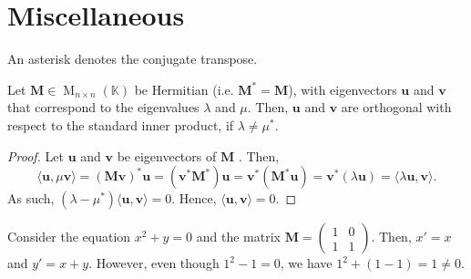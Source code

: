 \documentclass[../Notes.tex]{subfiles}
\begin{document}
\section{Miscellaneous}
An asterisk denotes the conjugate transpose.
\begin{theorem}{}{}
    Let \(\mathbf{M}\in \operatorname{M}_{n \times n}(\mathbb{K})\) be Hermitian (i.e. \(\mathbf{M}^{*}=\mathbf{M}\)), with eigenvectors \(\mathbf{u}\) and \(\mathbf{v}\) that correspond to the eigenvalues \(\lambda\) and \(\mu\). Then, \(\mathbf{u}\) and \(\mathbf{v}\) are orthogonal with respect to the standard inner product, if \(\lambda\neq\mu^{*}\). 
\end{theorem}
\begin{proof}
    Let \(\mathbf{u}\) and \(\mathbf{v}\) be eigenvectors of \(\mathbf{M}\) . Then, 
    \[\langle \mathbf{u},\mu\mathbf{v} \rangle=(\mathbf{M} \mathbf{v})^{*}\mathbf{u}=(\mathbf{v}^{*}\mathbf{M}^{*})\mathbf{u}=\mathbf{v}^{*}(\mathbf{M}^{*}\mathbf{u})=\mathbf{v}^{*}(\lambda \mathbf{u})=\langle \lambda \mathbf{u},\mathbf{v} \rangle.\]
    As such, \((\lambda-\mu^{*})\langle \mathbf{u},\mathbf{v} \rangle=0\). Hence, \(\langle \mathbf{u},\mathbf{v} \rangle=0\).
\end{proof}
Consider the equation \(x^2+y=0\) and the matrix
\(\mathbf{M}=\begin{pmatrix}
    1 & 0\\
    1 & 1
\end{pmatrix}\). Then, \(x'=x\) and \(y'=x+y\). However, even though \(1^2-1=0\), we have \(1^2+(1-1)=1\neq 0\).
    
\end{document}
